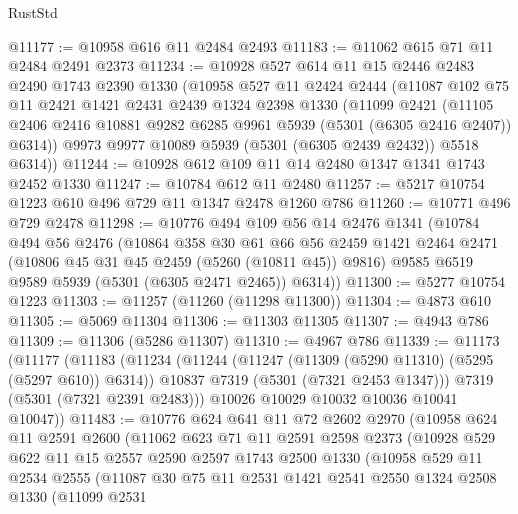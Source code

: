 \begin{lexlean}{RustStd}
\begin{coremodule}
@11177 := @10958 @616 @11 @2484 @2493
@11183 := @11062 @615 @71 @11 @2484 @2491 @2373
@11234 := @10928
    @527
    @614
    @11
    @15
    @2446
    @2483
    @2490
    @1743
    @2390
    @1330
    (@10958
      @527
      @11
      @2424
      @2444
      (@11087
        @102
        @75
        @11
        @2421
        @1421
        @2431
        @2439
        @1324
        @2398
        @1330
        (@11099
          @2421
          (@11105 @2406 @2416 @10881 @9282 @6285 @9961 @5939 (@5301 (@6305 @2416 @2407)) @6314))
        @9973
        @9977
        @10089
        @5939
        (@5301 (@6305 @2439 @2432))
        @5518
        @6314))
@11244 := @10928 @612 @109 @11 @14 @2480 @1347 @1341 @1743 @2452 @1330
@11247 := @10784 @612 @11 @2480
@11257 := @5217 @10754 @1223 @610 @496 @729 @11 @1347 @2478 @1260 @786
@11260 := @10771 @496 @729 @2478
@11298 := @10776
    @494
    @109
    @56
    @14
    @2476
    @1341
    (@10784
      @494
      @56
      @2476
      (@10864
        @358
        @30
        @61
        @66
        @56
        @2459
        @1421
        @2464
        @2471
        (@10806 @45 @31 @45 @2459 (@5260 (@10811 @45)) @9816)
        @9585
        @6519
        @9589
        @5939
        (@5301 (@6305 @2471 @2465))
        @6314))
@11300 := @5277 @10754 @1223
@11303 := @11257 (@11260 (@11298 @11300))
@11304 := @4873 @610
@11305 := @5069 @11304
@11306 := @11303 @11305
@11307 := @4943 @786
@11309 := @11306 (@5286 @11307)
@11310 := @4967 @786
@11339 := @11173
    (@11177
      (@11183
        (@11234
          (@11244
            (@11247 (@11309 (@5290 @11310) (@5295 (@5297 @610)) @6314))
            @10837
            @7319
            (@5301 (@7321 @2453 @1347)))
          @7319
          (@5301 (@7321 @2391 @2483)))
        @10026
        @10029
        @10032
        @10036
        @10041
        @10047))
@11483 := @10776
    @624
    @641
    @11
    @72
    @2602
    @2970
    (@10958
      @624
      @11
      @2591
      @2600
      (@11062
        @623
        @71
        @11
        @2591
        @2598
        @2373
        (@10928
          @529
          @622
          @11
          @15
          @2557
          @2590
          @2597
          @1743
          @2500
          @1330
          (@10958
            @529
            @11
            @2534
            @2555
            (@11087
              @30
              @75
              @11
              @2531
              @1421
              @2541
              @2550
              @1324
              @2508
              @1330
              (@11099
                @2531

\end{coremodule}
\end{lexlean}
